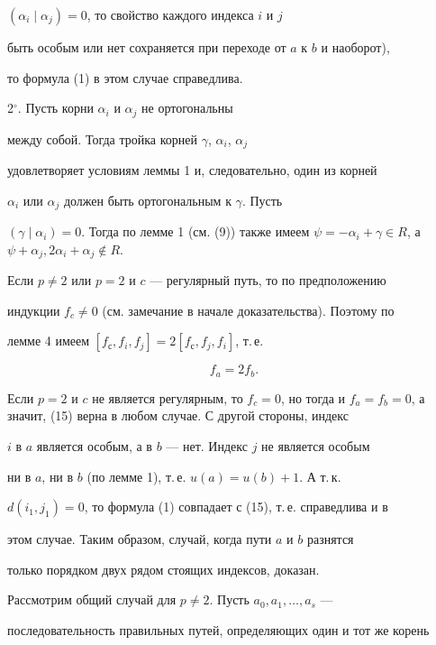 $(\alpha_i\mid \alpha_j)=0$, то свойство каждого индекса $i$ и $j$


быть особым или нет сохраняется при переходе от $a$ к $b$ и наоборот),


то формула (1) в этом случае справедлива.





2$^\circ $. Пусть корни $\alpha_i$ и $\alpha_j$ не ортогональны


между собой. Тогда тройка корней $\gamma$, $\alpha_i$, $\alpha_j$


удовлетворяет условиям леммы 1 и, следовательно, один из корней


$\alpha_i$ или $\alpha_j$ должен быть ортогональным к $\gamma $. Пусть


$(\gamma\mid \alpha_i)=0$. Тогда по лемме 1 (см. (9)) также имеем $\psi=


-\alpha_i+\gamma\in R$, а $\psi+\alpha_j,2\alpha_i+\alpha_j\notin R$.


Если $p\ne 2$ или $p=2$ и $c$ --- регулярный путь, то по предположению


индукции $f_c\ne 0$ (см. замечание в начале доказательства). Поэтому по


лемме 4 имеем $[f_с,f_i,f_j]=2[f_с,f_j,f_i]$, т.\,е.


\begin{equation}


f_a=2f_b.


\end{equation}


Если $p=2$ и $c$ не является регулярным, то $f_c=0$, но тогда и $f_a=


f_b=0$, а значит, (15) верна в любом случае. С другой стороны, индекс


$i$ в $a$ является особым, а в $b$ --- нет. Индекс $j$ не является особым


ни в $a$, ни в $b$ (по лемме 1), т.\,е. $u(a)=u(b)+1$. А т.\,к.


$d(i_1,j_1)=0$, то формула (1) совпадает с (15), т.\,е. справедлива и в


этом случае. Таким образом, случай, когда пути $a$ и $b$ разнятся


только порядком двух рядом стоящих индексов, доказан.





Рассмотрим общий случай для $p\ne 2$. Пусть $a_0,a_1,\dotsc,a_s$ ---


последовательность правильных путей, определяющих один и тот же корень


